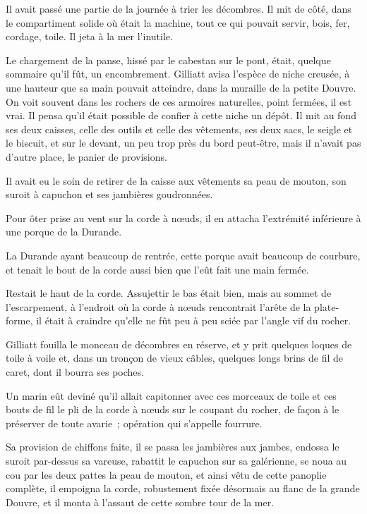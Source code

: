 \documentclass[french,twoside]{book} %
\begin{document}
Il avait passé une partie de la journée à trier les décombres. Il mit de côté, dans le compartiment solide où était la machine, tout ce qui pouvait servir, bois, fer, cordage, toile. Il jeta à la mer l’inutile.\par
Le chargement de la panse, hissé par le cabestan  sur le pont, était, quelque sommaire qu’il fût, un encombrement. Gilliatt avisa l’espèce de niche creusée, à une hauteur que sa main pouvait atteindre, dans la muraille de la petite Douvre. On voit souvent dans les rochers de ces armoires naturelles, point fermées, il est vrai. Il pensa qu’il était possible de confier à cette niche un dépôt. Il mit au fond ses deux caisses, celle des outils et celle des vêtements, ses deux sacs, le seigle et le biscuit, et sur le devant, un peu trop près du bord peut-être, mais il n’avait pas d’autre place, le panier de provisions.\par
Il avait eu le soin de retirer de la caisse aux vêtements sa peau de mouton, son suroit à capuchon et ses jambières goudronnées.\par
Pour ôter prise au vent sur la corde à nœuds, il en attacha l’extrémité inférieure à une porque de la Durande.\par
La Durande ayant beaucoup de rentrée, cette porque avait beaucoup de courbure, et tenait le bout de la corde aussi bien que l’eût fait une main fermée.\par
Restait le haut de la corde. Assujettir le bas était bien, mais au sommet de l’escarpement, à l’endroit où la corde à nœuds rencontrait l’arête de la plate-forme, il était à craindre qu’elle ne fût peu à peu sciée par l’angle vif du rocher.\par
Gilliatt fouilla le monceau de décombres en réserve, et y prit quelques loques de toile à voile et, dans un tronçon de vieux câbles, quelques longs brins de fil de caret, dont il bourra ses poches.\par
Un marin eût deviné qu’il allait capitonner avec ces  morceaux de toile et ces bouts de fil le pli de la corde à nœuds sur le coupant du rocher, de façon à le préserver de toute avarie ; opération qui s’appelle fourrure.\par
Sa provision de chiffons faite, il se passa les jambières aux jambes, endossa le suroit par-dessus sa vareuse, rabattit le capuchon sur sa galérienne, se noua au cou par les deux pattes la peau de mouton, et ainsi vêtu de cette panoplie complète, il empoigna la corde, robustement fixée désormais au flanc de la grande Douvre, et il monta à l’assaut de cette sombre tour de la mer.\par
\end{document}
